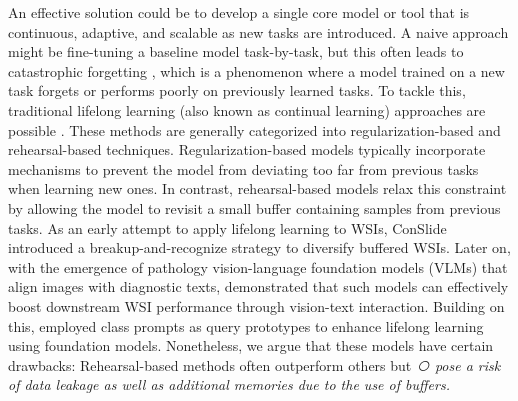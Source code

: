 \documentclass[10pt,twocolumn,letterpaper]{article}
\begin{document}
An effective solution could be to develop a single core model or tool that is continuous, adaptive, and scalable as new tasks are introduced. A naive approach might be fine-tuning a baseline model task-by-task, but this often leads to catastrophic forgetting \cite{mccloskey1989catastrophic,boschini2022transfer}, which is a phenomenon where a model trained on a new task forgets or performs poorly on previously learned tasks. To tackle this, traditional lifelong learning \cite{de2021continual} (also known as continual learning) approaches are possible \cite{huang2023conslide,gou2025queryable}. These methods are generally categorized into regularization-based and rehearsal-based techniques. Regularization-based models \cite{li2017learning,rebuffi2017icarl,kirkpatrick2017overcoming,zenke2017continual,aljundi2018memory} typically incorporate mechanisms to prevent the model from deviating too far from previous tasks when learning new ones. In contrast, rehearsal-based models \cite{agem,derpp,erace,huang2023conslide} relax this constraint by allowing the model to revisit a small buffer containing samples from previous tasks. As an early attempt to apply lifelong learning to WSIs, ConSlide \cite{huang2023conslide} introduced a breakup-and-recognize strategy to diversify buffered WSIs. Later on, with the emergence of pathology vision-language foundation models (VLMs) \cite{lu2023visual,huang2023visual,lu2024visual,ding2024multimodal} that align images with diagnostic texts, \cite{huang2024free} demonstrated that such models can effectively boost downstream WSI performance through vision-text interaction. Building on this, \cite{gou2025queryable} employed class prompts as query prototypes to enhance lifelong learning using foundation models. Nonetheless, we argue that these models have certain drawbacks:
Rehearsal-based methods often outperform others but \textit{\textcircled{} pose a risk of data leakage as well as additional memories due to the use of buffers.}
\end{document}
